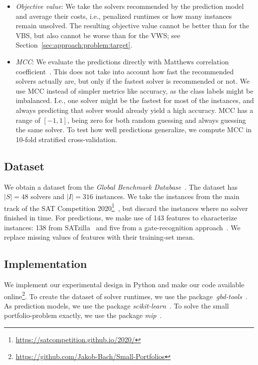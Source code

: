 \documentclass[conference]{IEEEtran}
\begin{document}
\begin{itemize}
	\item \emph{Objective value}:
	We take the solvers recommended by the prediction model and average their costs, i.e., penalized runtimes or how many instances remain unsolved.
	The resulting objective value cannot be better than for the VBS, but also cannot be worse than for the VWS; see Section~\ref{sec:approach:problem:target}.
	\item \emph{MCC}:
	We evaluate the predictions directly with Matthews correlation coefficient~\cite{matthews1975comparison, gorodkin2004comparing}.
	This does not take into account how fast the recommended solvers actually are, but only if the fastest solver is recommended or not.
	We use MCC instead of simpler metrics like accuracy, as the class labels might be imbalanced.
	I.e., one solver might be the fastest for most of the instances, and always predicting that solver would already yield a high accuracy.
	MCC has a range of $[-1,1]$, being zero for both random guessing and always guessing the same solver.
	To test how well predictions generalize, we compute MCC in 10-fold stratified cross-validation.
\end{itemize}

\subsection{Dataset}

We obtain a dataset from the \emph{Global Benchmark Database}~\cite{iser2020collaborative}.
The dataset has $|S| = 48$ solvers and $|I| = 316$ instances.
We take the instances from the main track of the SAT Competition 2020\footnote{\url{https://satcompetition.github.io/2020/}}~\cite{balyo2020proceedings}, but discard the instances where no solver finished in time.
For predictions, we make use of 143 features to characterize instances:
138 from SATzilla~\cite{xu2008satzilla, xu2012satzilla2012} and five from a gate-recognition approach~\cite{iser2020recognition}.
We replace missing values of features with their training-set mean.


\subsection{Implementation}

We implement our experimental design in Python and make our code available online\footnote{\url{https://github.com/Jakob-Bach/Small-Portfolios}}.
To create the dataset of solver runtimes, we use the package~\emph{gbd-tools}~\cite{iser2020collaborative}.
As prediction models, we use the package \emph{scikit-learn}~\cite{scikit-learn}.
To solve the small portfolio-problem exactly, we use the package \emph{mip}~\cite{python-mip}.
\end{document}
